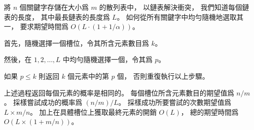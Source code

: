\startEXERCISE
將 $n$ 個關鍵字存儲在大小爲 $m$ 的散列表中，
以鏈表解決衝突，
我們知道每個鏈表的長度，
其中最長鏈表的長度爲 $L$。
如何從所有關鍵字中均勻隨機地選取其一，
要求期望時間爲 $O(L\cdot (1+1/\alpha))$。
\stopEXERCISE

\startANSWER
首先，隨機選擇一個槽位，令其所含元素數目爲 $k$。

然後，在 $1,2,\ldots,L$ 中均勻隨機選擇一個，令其爲 $p$。

如果 $p\le k$ 則返回 $k$ 個元素中的第 $p$ 個，
否則重復執行以上步驟。

上述過程返回每個元素的概率是相同的。
每個槽位所含元素數目的期望值爲 $n/m$。
採樣嘗試成功的概率爲 $(n/m)/L$。
採樣成功所要嘗試的次數期望值爲 $L \times m / n$。
加上在具體槽位上獲取最終元素的開銷 $O(L)$，
總的期望時間爲 $O(L\times (1+m/n))$。
\stopANSWER
